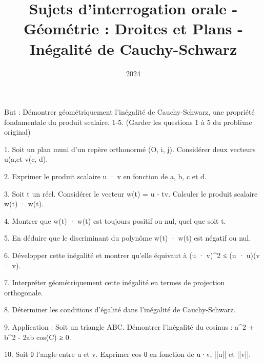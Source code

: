 \documentclass[10pt,a4paper]{article}
\title{Sujets d'interrogation orale - Géométrie : Droites et Plans - Inégalité de Cauchy-Schwarz}
\author{}
\date{2024}
\begin{document}
\maketitle

But : Démontrer géométriquement l'inégalité de Cauchy-Schwarz, une propriété fondamentale du produit scalaire. 1-5. (Garder les questions 1 à 5 du problème original)

1. Soit un plan muni d'un repère orthonormé (O, i, j). Considérer deux vecteurs u(a,\ql et v(c, d).

2. Exprimer le produit scalaire u · v en fonction de a, b, c et d.

3. Soit t un réel. Considérer le vecteur w(t) = u - tv. Calculer le produit scalaire w(t) · w(t).

4. Montrer que w(t) · w(t) est toujours positif ou nul, quel que soit t.

5. En déduire que le discriminant du polynôme w(t) · w(t) est négatif ou nul.

6. Développer cette inégalité et montrer qu'elle équivaut à (u · v)^2 ≤ (u · u)(v · v).

7. Interpréter géométriquement cette inégalité en termes de projection orthogonale.

8. Déterminer les conditions d'égalité dans l'inégalité de Cauchy-Schwarz.

9. Application : Soit un triangle ABC. Démontrer l'inégalité du cosinus : a^2 + b^2 - 2ab cos(C) ≥ 0.

10. Soit θ l'angle entre u et v. Exprimer cos θ en fonction de u·v, ||u|| et ||v||.
\end{document}
